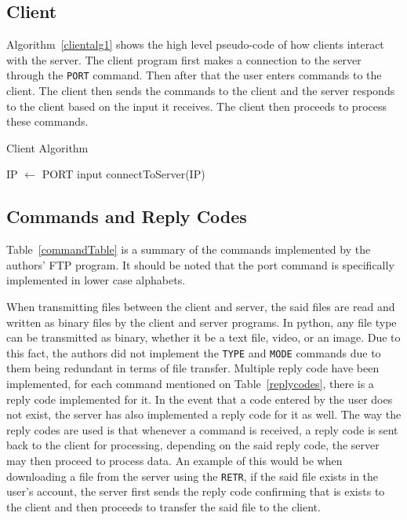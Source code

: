 \documentclass[journal, a4paper]{IEEEtran}
\begin{document}





\subsection{Client}
Algorithm~\ref{clientalg1} shows the high level pseudo-code of how clients interact with the server. The client program first makes a connection to the server through the \texttt{PORT} command. Then after that the user enters commands to the client. The client then sends the commands to the client and the server responds to the client based  on the input it receives. The client then proceeds to process these commands. 
\begin{algorithm}
	\caption{Client Algorithm}\label{clientalg1}
	\begin{algorithmic}[1]
		IP $\gets$ PORT input
		connectToServer(IP)
		\EndProcedure
	\end{algorithmic}
\end{algorithm}


\subsection{Commands and Reply Codes}
Table~\ref{commandTable} is a summary of the commands implemented by the authors' FTP program. It should be noted that the port command is specifically implemented in lower case alphabets.

When transmitting files between the client and server, the said files are read and written as binary files by the client and server programs. In python, any file type can be transmitted as binary, whether it be a text file, video, or an image. Due to this fact, the authors did not implement the \texttt{TYPE} and \texttt{MODE} commands due to them being redundant in terms of file transfer. Multiple reply code have been implemented, for each command mentioned on Table~\ref{replycodes}, there is a reply code implemented for it. In the event that a code entered by the user does not exist, the server has also implemented a reply code for it as well. The way the reply codes are used is that whenever a command is received, a reply code is sent back to the client for processing, depending on the said reply code, the server may then proceed to process data. An example of this would be when downloading a file from the server using the \texttt{RETR}, if the said file exists in the user's account, the server first sends the reply code confirming that is exists to the client and then proceeds to transfer the said file to the client.
\end{document}
